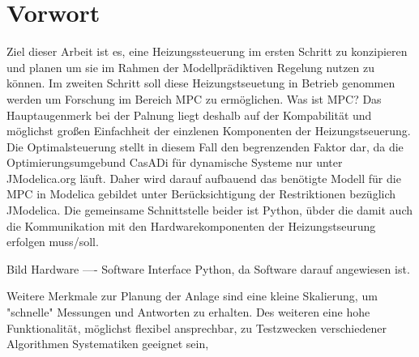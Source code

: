 %
%
%
\chapter*{Vorwort}
\thispagestyle{empty}
Ziel dieser Arbeit ist es, eine Heizungssteuerung im ersten Schritt zu konzipieren und planen um sie im Rahmen der  Modellprädiktiven Regelung nutzen zu können. Im zweiten Schritt soll diese Heizungstseuetung in Betrieb genommen werden um Forschung im Bereich MPC zu ermöglichen.
Was ist MPC?
Das Hauptaugenmerk bei der Palnung liegt deshalb auf der Kompabilität und möglichst großen Einfachheit der einzlenen Komponenten der Heizungstseuerung. 
Die Optimalsteuerung stellt in diesem Fall den begrenzenden Faktor dar, da die Optimierungsumgebund CasADi für dynamische Systeme nur unter JModelica.org läuft. Daher wird darauf aufbauend das benötigte Modell für die MPC in Modelica gebildet unter Berücksichtigung der Restriktionen bezüglich JModelica. Die gemeinsame Schnittstelle beider ist Python, übder die damit auch die Kommunikation mit den Hardwarekomponenten der Heizungstseurung erfolgen muss/soll.

Bild Hardware ---- Software   Interface Python, da Software darauf angewiesen ist.

Weitere Merkmale zur Planung der Anlage sind eine kleine Skalierung, um "schnelle" Messungen und Antworten zu erhalten. Des weiteren eine hohe Funktionalität, möglichst flexibel ansprechbar, zu Testzwecken verschiedener Algorithmen Systematiken geeignet sein, 